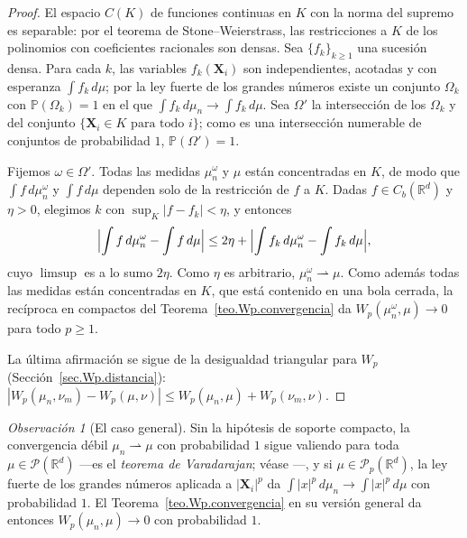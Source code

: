 \documentclass[12pt, a4paper]{amsbook}
\newcommand{\R}{{\mathbb R}}
\renewcommand{\P}{{\mathbb P}}
\theoremstyle{remark}
\newtheorem{obs}[teo]{Observación}
\theoremstyle{definition}
\numberwithin{section}{chapter}
\numberwithin{subsection}{section}
\numberwithin{equation}{section}
\numberwithin{figure}{chapter}
\begin{document}
\begin{proof}
El espacio $C(K)$ de funciones continuas en $K$ con la norma del supremo es
separable: por el teorema de Stone--Weierstrass, las restricciones a $K$ de
los polinomios con coeficientes racionales son densas. Sea
$\{f_k\}_{k\ge1}$ una sucesión densa. Para cada $k$, las variables
$f_k(\mathbf X_i)$ son independientes, acotadas y con esperanza
$\int f_k\,d\mu$; por la ley fuerte de los grandes números existe un
conjunto $\Omega_k$ con $\P(\Omega_k)=1$ en el que
$\int f_k\,d\mu_n\to\int f_k\,d\mu$. Sea $\Omega'$ la intersección de los
$\Omega_k$ y del conjunto $\{\mathbf X_i\in K\text{ para todo }i\}$; como es
una intersección numerable de conjuntos de probabilidad $1$,
$\P(\Omega')=1$.

Fijemos $\omega\in\Omega'$. Todas las medidas $\mu_n^\omega$ y $\mu$ están
concentradas en $K$, de modo que $\int f\,d\mu_n^\omega$ y $\int f\,d\mu$
dependen solo de la restricción de $f$ a $K$. Dadas $f\in C_b(\R^d)$ y
$\eta>0$, elegimos $k$ con $\sup_K|f-f_k|<\eta$, y entonces
\[
\Bigl|\int f\,d\mu_n^\omega-\int f\,d\mu\Bigr|
\le2\eta+\Bigl|\int f_k\,d\mu_n^\omega-\int f_k\,d\mu\Bigr|,
\]
cuyo $\limsup$ es a lo sumo $2\eta$. Como $\eta$ es arbitrario,
$\mu_n^\omega\rightharpoonup\mu$. Como además todas las medidas están
concentradas en $K$, que está contenido en una bola cerrada, la recíproca en
compactos del Teorema~\ref{teo.Wp.convergencia} da
$W_p(\mu_n^\omega,\mu)\to0$ para todo $p\ge1$.

La última afirmación se sigue de la desigualdad triangular para $W_p$
(Sección~\ref{sec.Wp.distancia}):
$|W_p(\mu_n,\nu_m)-W_p(\mu,\nu)|\le W_p(\mu_n,\mu)+W_p(\nu_m,\nu)$.
\end{proof}

\begin{obs}[El caso general]\label{obs.Wp.empirica.general}
Sin la hipótesis de soporte compacto, la convergencia débil
$\mu_n\rightharpoonup\mu$ con probabilidad $1$ sigue valiendo para toda
$\mu\in\mathcal P(\R^d)$ —es el \emph{teorema de Varadarajan}; véase
\cite[Theorem~11.4.1]{Dudley2002}—, y si $\mu\in\mathcal P_p(\R^d)$, la ley
fuerte de los grandes números aplicada a $|\mathbf X_i|^p$ da
$\int|x|^p\,d\mu_n\to\int|x|^p\,d\mu$ con probabilidad $1$. El
Teorema~\ref{teo.Wp.convergencia} en su versión general da entonces
$W_p(\mu_n,\mu)\to0$ con probabilidad $1$.
\end{obs}
\end{document}
